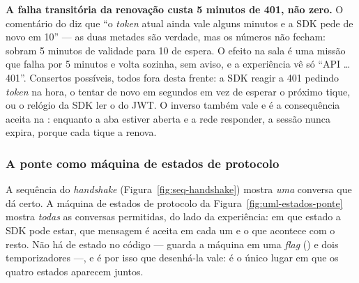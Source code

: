 \begin{limitacao}
\textbf{A falha transitória da renovação custa 5 minutos de 401, não zero.} O
comentário do  diz que \enquote{o \emph{token} atual ainda vale alguns
minutos e a SDK pede de novo em 10} --- as duas metades são verdade, mas os
números não fecham: sobram 5 minutos de validade para 10 de espera. O efeito na
sala é uma missão que falha por 5 minutos e volta sozinha, sem aviso, e a
experiência vê só \enquote{API \ldots{} \seta{} 401}. Consertos possíveis, todos
fora desta frente: a SDK reagir a 401 pedindo \emph{token} na hora, o
 tentar de novo em segundos em vez de esperar o próximo tique, ou o
relógio da SDK ler o  do JWT. O inverso também vale e é a consequência
aceita na : enquanto a aba estiver aberta e a rede responder, a
sessão nunca expira, porque cada tique a renova.
\end{limitacao}

\subsubsection{A ponte como máquina de estados de protocolo}

A sequência do \emph{handshake} (Figura~\ref{fig:seq-handshake}) mostra \emph{uma}
conversa que dá certo. A máquina de estados de protocolo da
Figura~\ref{fig:uml-estados-ponte} mostra \emph{todas} as conversas permitidas,
do lado da experiência: em que estado a SDK pode estar, que mensagem é aceita em
cada um e o que acontece com o resto. Não há  de estado no código ---
 guarda a máquina em uma \emph{flag}
() e dois temporizadores ---, e é por isso que desenhá-la vale: é o
único lugar em que os quatro estados aparecem juntos.

